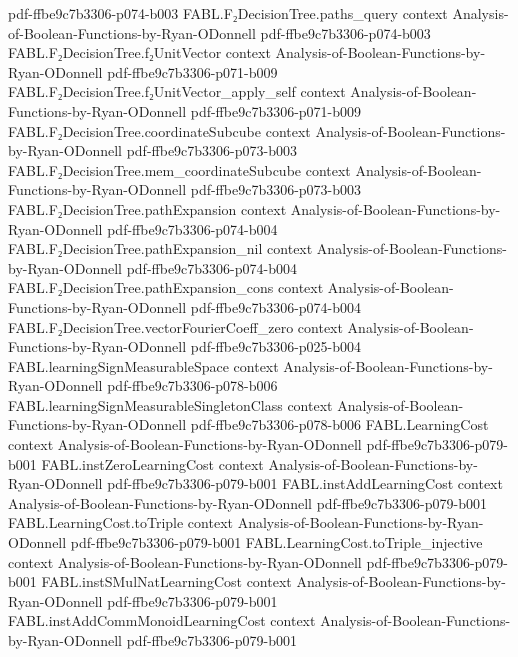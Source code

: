 \begin{theorem}
  {pdf-ffbe9c7b3306-p074-b003}
\proofstep
  {FABL.F₂DecisionTree.paths_query}
  {context}
  {Analysis-of-Boolean-Functions-by-Ryan-ODonnell}
  {pdf-ffbe9c7b3306-p074-b003}
\proofstep
  {FABL.F₂DecisionTree.f₂UnitVector}
  {context}
  {Analysis-of-Boolean-Functions-by-Ryan-ODonnell}
  {pdf-ffbe9c7b3306-p071-b009}
\proofstep
  {FABL.F₂DecisionTree.f₂UnitVector_apply_self}
  {context}
  {Analysis-of-Boolean-Functions-by-Ryan-ODonnell}
  {pdf-ffbe9c7b3306-p071-b009}
\proofstep
  {FABL.F₂DecisionTree.coordinateSubcube}
  {context}
  {Analysis-of-Boolean-Functions-by-Ryan-ODonnell}
  {pdf-ffbe9c7b3306-p073-b003}
\proofstep
  {FABL.F₂DecisionTree.mem_coordinateSubcube}
  {context}
  {Analysis-of-Boolean-Functions-by-Ryan-ODonnell}
  {pdf-ffbe9c7b3306-p073-b003}
\proofstep
  {FABL.F₂DecisionTree.pathExpansion}
  {context}
  {Analysis-of-Boolean-Functions-by-Ryan-ODonnell}
  {pdf-ffbe9c7b3306-p074-b004}
\proofstep
  {FABL.F₂DecisionTree.pathExpansion_nil}
  {context}
  {Analysis-of-Boolean-Functions-by-Ryan-ODonnell}
  {pdf-ffbe9c7b3306-p074-b004}
\proofstep
  {FABL.F₂DecisionTree.pathExpansion_cons}
  {context}
  {Analysis-of-Boolean-Functions-by-Ryan-ODonnell}
  {pdf-ffbe9c7b3306-p074-b004}
\proofstep
  {FABL.F₂DecisionTree.vectorFourierCoeff_zero}
  {context}
  {Analysis-of-Boolean-Functions-by-Ryan-ODonnell}
  {pdf-ffbe9c7b3306-p025-b004}
\proofstep
  {FABL.learningSignMeasurableSpace}
  {context}
  {Analysis-of-Boolean-Functions-by-Ryan-ODonnell}
  {pdf-ffbe9c7b3306-p078-b006}
\proofstep
  {FABL.learningSignMeasurableSingletonClass}
  {context}
  {Analysis-of-Boolean-Functions-by-Ryan-ODonnell}
  {pdf-ffbe9c7b3306-p078-b006}
\proofstep
  {FABL.LearningCost}
  {context}
  {Analysis-of-Boolean-Functions-by-Ryan-ODonnell}
  {pdf-ffbe9c7b3306-p079-b001}
\proofstep
  {FABL.instZeroLearningCost}
  {context}
  {Analysis-of-Boolean-Functions-by-Ryan-ODonnell}
  {pdf-ffbe9c7b3306-p079-b001}
\proofstep
  {FABL.instAddLearningCost}
  {context}
  {Analysis-of-Boolean-Functions-by-Ryan-ODonnell}
  {pdf-ffbe9c7b3306-p079-b001}
\proofstep
  {FABL.LearningCost.toTriple}
  {context}
  {Analysis-of-Boolean-Functions-by-Ryan-ODonnell}
  {pdf-ffbe9c7b3306-p079-b001}
\proofstep
  {FABL.LearningCost.toTriple_injective}
  {context}
  {Analysis-of-Boolean-Functions-by-Ryan-ODonnell}
  {pdf-ffbe9c7b3306-p079-b001}
\proofstep
  {FABL.instSMulNatLearningCost}
  {context}
  {Analysis-of-Boolean-Functions-by-Ryan-ODonnell}
  {pdf-ffbe9c7b3306-p079-b001}
\proofstep
  {FABL.instAddCommMonoidLearningCost}
  {context}
  {Analysis-of-Boolean-Functions-by-Ryan-ODonnell}
  {pdf-ffbe9c7b3306-p079-b001}

\end{theorem}
